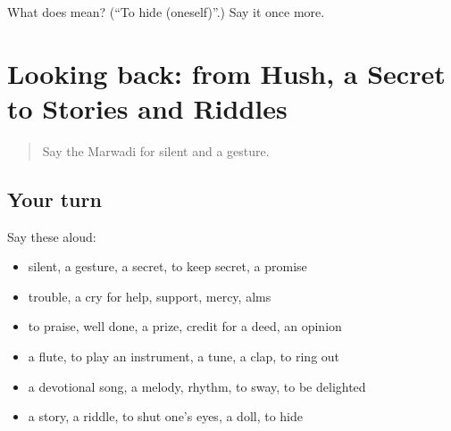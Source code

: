 \begin{tcolorbox}[breakable,colback=teal!4,colframe=teal!35!black,title={Before you move on}]
What does  mean? (\textquotedblleft{}To hide (oneself)\textquotedblright{}.) Say it once more.
\end{tcolorbox}
\section[(dialogue)]{Looking back: from Hush, a Secret to Stories and Riddles}

\label{lesson:MW-R278-review-273-278}



\begin{quote}
Say the Marwadi for silent and a gesture.
\end{quote}

\subsection*{Your turn}
Say these aloud:

\begin{itemize}
\raggedright
  \item silent, a gesture, a secret, to keep secret, a promise
  \item trouble, a cry for help, support, mercy, alms
  \item to praise, well done, a prize, credit for a deed, an opinion
  \item a flute, to play an instrument, a tune, a clap, to ring out
  \item a devotional song, a melody, rhythm, to sway, to be delighted
  \item a story, a riddle, to shut one's eyes, a doll, to hide
\end{itemize}

